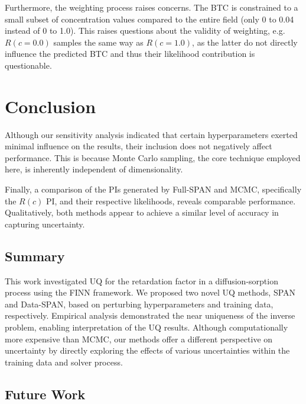 Furthermore, the weighting process raises concerns. The BTC is constrained to a small subset of concentration values compared to the entire field (only 0 to 0.04 instead of 0 to 1.0). This raises questions about the validity of weighting, e.g. $R(c=0.0)$ samples the same way as $R(c=1.0)$, as the latter do not directly influence the predicted BTC and thus their likelihood contribution is questionable.


\section{Conclusion}
Although our sensitivity analysis indicated that certain hyperparameters exerted minimal influence on the results, their inclusion does not negatively affect performance. This is because Monte Carlo sampling, the core technique employed here, is inherently independent of dimensionality.

Finally, a comparison of the PIs generated by Full-SPAN and MCMC, specifically the $R(c)$ PI, and their respective likelihoods, reveals comparable performance. Qualitatively, both methods appear to achieve a similar level of accuracy in capturing uncertainty.

\subsection{Summary}
This work investigated UQ for the retardation factor in a diffusion-sorption process using the FINN framework. We proposed two novel UQ methods, SPAN and Data-SPAN, based on perturbing hyperparameters and training data, respectively. Empirical analysis demonstrated the near uniqueness of the inverse problem, enabling interpretation of the UQ results. Although computationally more expensive than MCMC, our methods offer a different perspective on uncertainty by directly exploring the effects of various uncertainties within the training data and solver process.

\subsection{Future Work}






